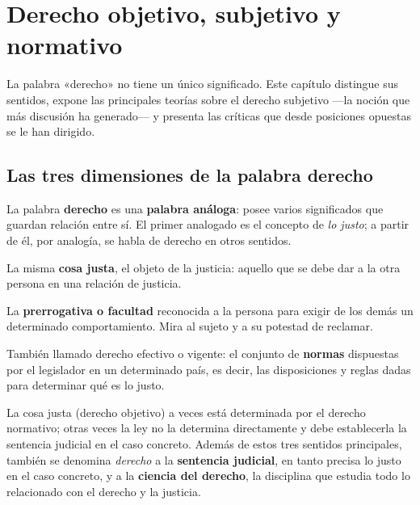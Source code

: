 \documentclass[12pt,oneside]{book}
\begin{document}
\chapter{Derecho objetivo, subjetivo y normativo}
\label{cap:objetivo}

La palabra «derecho» no tiene un único significado. Este capítulo distingue sus sentidos, expone las principales teorías sobre el derecho subjetivo ---la noción que más discusión ha generado--- y presenta las críticas que desde posiciones opuestas se le han dirigido.

\section{Las tres dimensiones de la palabra derecho}

La palabra \textbf{derecho} es una \textbf{palabra análoga}: posee varios significados que guardan relación entre sí. El primer analogado es el concepto de \textit{lo justo}; a partir de él, por analogía, se habla de derecho en otros sentidos.

\begin{definicion}
La misma \textbf{cosa justa}, el objeto de la justicia: aquello que se debe dar a la otra persona en una relación de justicia.
\end{definicion}

\begin{definicion}
La \textbf{prerrogativa o facultad} reconocida a la persona para exigir de los demás un determinado comportamiento. Mira al sujeto y a su potestad de reclamar.
\end{definicion}

\begin{definicion}
También llamado derecho efectivo o vigente: el conjunto de \textbf{normas} dispuestas por el legislador en un determinado país, es decir, las disposiciones y reglas dadas para determinar qué es lo justo.
\end{definicion}

La cosa justa (derecho objetivo) a veces está determinada por el derecho normativo; otras veces la ley no la determina directamente y debe establecerla la sentencia judicial en el caso concreto. Además de estos tres sentidos principales, también se denomina \textit{derecho} a la \textbf{sentencia judicial}, en tanto precisa lo justo en el caso concreto, y a la \textbf{ciencia del derecho}, la disciplina que estudia todo lo relacionado con el derecho y la justicia.
\end{document}
